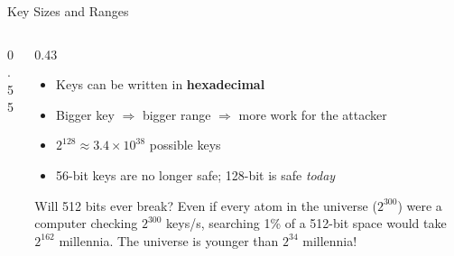 \documentclass[aspectratio=169,11pt,xcolor={table}]{beamer}
\begin{document}
\begin{frame}{Key Sizes and Ranges}
  \begin{columns}[c]
    \begin{column}{0.55\textwidth}
      \centering
    \end{column}
    \begin{column}{0.43\textwidth}
      \begin{itemize}\small\setlength{\itemsep}{4pt}
        \item Keys can be written in \textbf{hexadecimal}
        \item Bigger key $\Rightarrow$ bigger range $\Rightarrow$ more work for the attacker
        \item $2^{128} \approx 3.4\times10^{38}$ possible keys
        \item 56-bit keys are no longer safe; 128-bit is safe \emph{today}
      \end{itemize}
      \vspace{2mm}
      \begin{exampleblock}{Will 512 bits ever break?}
        \small Even if every atom in the universe ($2^{300}$) were a computer checking $2^{300}$ keys/s, searching 1\% of a 512-bit space would take $2^{162}$ millennia. The universe is younger than $2^{34}$ millennia!
      \end{exampleblock}
    \end{column}
  \end{columns}
\end{frame}
\end{document}
